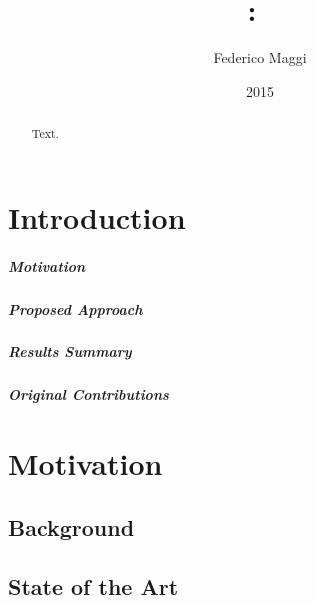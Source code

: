 \documentclass[a4paper]{memoir}
\title{\thesystem:~\thesystemlong}
\author{Federico Maggi}
\date{2015}
\begin{document}
\frontmatter

\begin{titlingpage}
  \maketitle
\end{titlingpage}

\begin{abstract}
  Text.
\end{abstract}

\clearpage

\tableofcontents

\clearpage

\mainmatter

\chapter{Introduction}
\label{cha:introduction}

\paragraph*{Motivation}
\paragraph*{Proposed Approach}
\paragraph*{Results Summary}
\paragraph*{Original Contributions}

\chapter{Motivation}
\label{cha:motivation}

\section{Background}
\label{sec:background}

\section{State of the Art}
\label{sec:soa}
\end{document}
